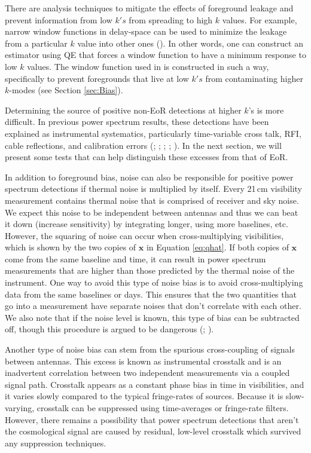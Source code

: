 \documentclass[preprint2,numberedappendix,tighten]{aastex6}
\begin{document}
There are analysis techniques to mitigate the effects of foreground leakage and prevent information from low $k's$ from 
spreading to high $k$ values. For example, narrow window functions in delay-space can be used to minimize the leakage from a particular 
$k$ value into other ones (\citealt{liu_et_al2014b}). In other words, one can construct an estimator using QE that forces a 
window function to have a minimum response to low $k$ values. The window function used in  is constructed in such a way, 
specifically to prevent foregrounds that live at low $k's$ from contaminating higher $k$-modes (see Section \ref{sec:Bias}). 

Determining the source of positive non-EoR detections at higher $k$'s is more difficult. In previous power spectrum results, these detections have been explained as instrumental systematics, particularly time-variable cross talk, RFI, cable reflections, and calibration errors (; \citealt{parsons_et_al2014}; \citealt{dillon_et_al2014}; \citealt{beardsley_et_al2016}; \citealt{patil_et_al2017}). In the next section, we will present some tests that can help distinguish these excesses from that of EoR. 

In addition to foreground bias, noise can also be responsible for positive power spectrum detections if thermal noise is 
multiplied by itself. Every 21\,cm visibility measurement contains thermal noise that is comprised of receiver and sky noise. 
We expect this noise to be independent between antennas and thus we can beat it down (increase sensitivity) by integrating 
longer, using more baselines, etc. However, the squaring of noise can occur when cross-multiplying visibilities, which is shown by 
the two copies of $\textbf{x}$ in Equation \eqref{eq:qhat}. If both copies of $\textbf{x}$ come from the same baseline and time, it 
can result in power spectrum measurements that are higher than those predicted by the thermal noise of the instrument. One 
way to avoid this type of noise bias is to avoid cross-multiplying data from the same baselines or days. This ensures that the 
two quantities that go into a measurement have separate noises that don't correlate with each other. We also note that if the noise level is known, this type of bias can be subtracted off, though this procedure is argued to be dangerous (\citealt{dillon_et_al2014}; \citealt{parsons_et_al2014}).

Another type of noise bias can stem from the spurious cross-coupling of signals between antennas. This excess is known as 
instrumental crosstalk and is an inadvertent correlation between two independent measurements via a coupled signal path. 
Crosstalk appears as a constant phase bias in time in visibilities, and it varies slowly compared to the typical fringe-rates of 
sources. Because it is slow-varying, crosstalk can be suppressed using time-averages or fringe-rate filters. However, there 
remains a possibility that power spectrum detections that aren't the cosmological signal are caused by residual, low-level crosstalk which survived any 
suppression techniques. 
\end{document}
